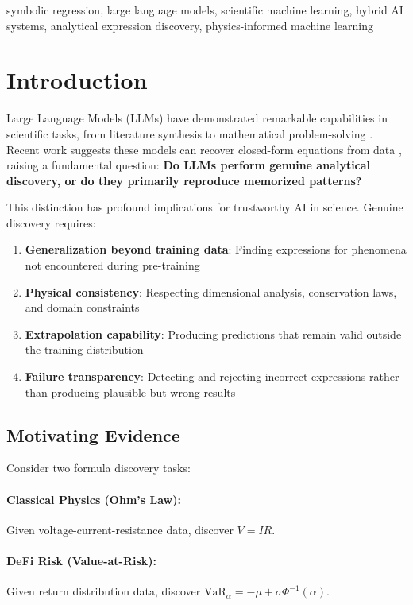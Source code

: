\documentclass[twoside,11pt]{article}
\begin{document}
\begin{keywords}
symbolic regression, large language models, scientific machine learning, hybrid AI systems, analytical expression discovery, physics-informed machine learning
\end{keywords}

\section{Introduction}

Large Language Models (LLMs) have demonstrated remarkable capabilities in scientific tasks, from literature synthesis to mathematical problem-solving \citep{brown2020language,wei2022chain,openai2023gpt4}. Recent work suggests these models can recover closed-form equations from data \citep{romera2023discovering}, raising a fundamental question: \textbf{Do LLMs perform genuine analytical discovery, or do they primarily reproduce memorized patterns?}

This distinction has profound implications for trustworthy AI in science. Genuine discovery requires:
\begin{enumerate}
\item \textbf{Generalization beyond training data}: Finding expressions for phenomena not encountered during pre-training
\item \textbf{Physical consistency}: Respecting dimensional analysis, conservation laws, and domain constraints
\item \textbf{Extrapolation capability}: Producing predictions that remain valid outside the training distribution
\item \textbf{Failure transparency}: Detecting and rejecting incorrect expressions rather than producing plausible but wrong results
\end{enumerate}

\subsection{Motivating Evidence}

Consider two formula discovery tasks:

\paragraph{Classical Physics (Ohm's Law):} Given voltage-current-resistance data, discover $V = IR$.

\paragraph{DeFi Risk (Value-at-Risk):} Given return distribution data, discover $\text{VaR}_\alpha = -\mu + \sigma \Phi^{-1}(\alpha)$.
\end{document}
